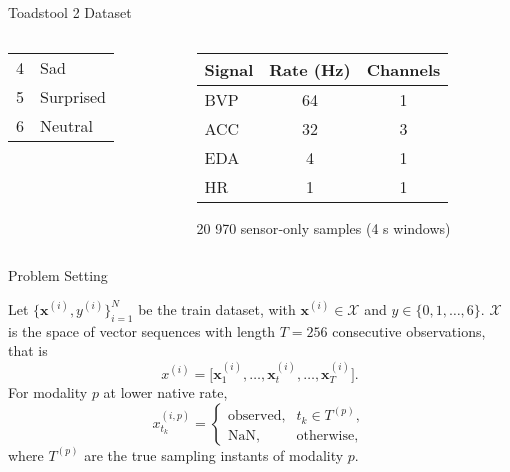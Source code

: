 \begin{frame}{Toadstool 2 Dataset}
\begin{columns}[T]
\begin{column}{0.5\textwidth}
\begin{center}
\begin{columns}[t]
	\centering\footnotesize
	\begin{tabular}{r l}
		4 & Sad        \\
		5 & Surprised  \\
		6 & Neutral
	\end{tabular}
\end{columns}


			\end{center}
			
		\end{column}
		\begin{column}{0.5\textwidth}
		\centering
		\small
		\begin{tabular}{lcc}
		\toprule
		\textbf{Signal} & \textbf{Rate (Hz)} & \textbf{Channels} \\
		\midrule
		BVP  & 64 & 1      \\
		ACC  & 32 & 3 		\\
		EDA  & 4  & 1      \\
		HR   & 1  & 1      \\
		\bottomrule
		\end{tabular}
		
		\begin{block}{}
			20 970 sensor‐only samples (4 s windows)
		\end{block}

		\end{column}
		
	\end{columns}
\end{frame}


\begin{frame}[t]{Problem Setting}

	\begin{block}{}
		Let $\{\boldsymbol{x}^{(i)}, y^(i)\}_{i=1}^{N}$ be the train dataset, with $\boldsymbol{x}^{(i)}\in\mathcal{X}$ and $y \in \{0, 1, \dots, 6\}$. $\mathcal{X}$ is the space of vector sequences with length $T = 256$ consecutive observations, that is
		\[
		x^{(i)}
		=\bigl[\boldsymbol{x}^{(i)}_{1},\dots, \boldsymbol{x}^{(i)}_{t}, \dots,\boldsymbol{x}^{(i)}_{T}\bigr].
		\]
		For modality $p$ at lower native rate,
		\[
		x^{(i,p)}_{t_k} =
		\begin{cases}
			\text{observed}, & t_k\in T^{(p)},\\
			\mathrm{NaN},    & \text{otherwise},
		\end{cases}
		\]
		where $T^{(p)}$ are the true sampling instants of modality $p$.
	\end{block}
\end{frame}
